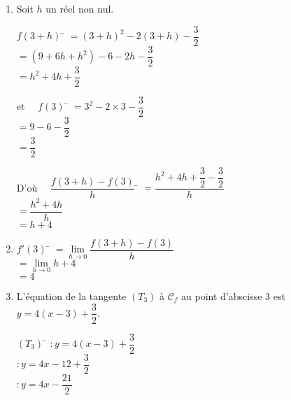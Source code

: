 \documentclass[a4paper,11pt,exos]{nsi}
\begin{document}
\textcolor{UGLiBlue}{
    \begin{enumerate}
        \item Soit $h$ un réel non nul.
        \begin{multicols}{2}
            \begin{tabbing}
                $f(3+h)$ \= $=(3+h)^2-2(3+h)-\dfrac{3}{2}$\\
                \> $= (9+6h+h^2)-6-2h-\dfrac{3}{2}$\\
                \> $= h^2+4h+\dfrac{3}{2}$   
            \end{tabbing}
            \begin{tabbing}
                et $\quad f(3)$ \= $=3^2-2\times 3-\dfrac{3}{2}$\\
                \> $=9-6-\dfrac{3}{2}$\\
                \> $=\dfrac{3}{2}$
            \end{tabbing}
        \end{multicols}
        \begin{tabbing}
            D'où $\quad \dfrac{f(3+h)-f(3)}{h}$ \= $= \dfrac{h^2+4h+\dfrac{3}{2}-\dfrac{3}{2}}{h}$\\
            \> $= \dfrac{h^2+4h}{h}$\\
            \> $= h+4$
        \end{tabbing}
        \item \begin{tabbing}
            $f'(3)$ \= $= \lim\limits_{h\to 0} \dfrac{f(3+h)-f(3)}{h}$\\[.5em]
            \> $= \lim\limits_{h\to 0} h+4$\\[.5em]
            \> $= 4$
        \end{tabbing}
        \item L'équation de la tangente $(T_3)$ à $\mathcal{C}_f$ au point d'abscisse 3 est $y=4(x-3)+\dfrac{3}{2}$.
        \begin{tabbing}
            $(T_3)$ \= $: y=4(x-3)+\dfrac{3}{2}$\\[.5em]
            \> $: y=4x-12+\dfrac{3}{2}$\\[.5em]
            \> $: y=4x-\dfrac{21}{2}$
        \end{tabbing}
    \end{enumerate}
}
\end{document}
